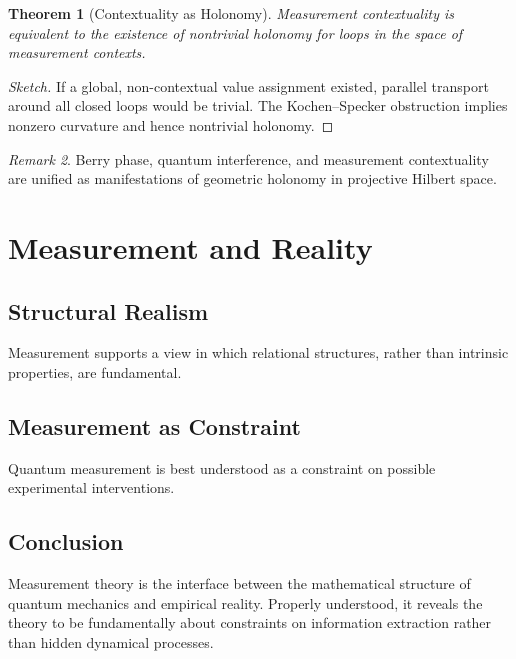 \documentclass[12pt]{book}
\theoremstyle{plain}
\newtheorem{theorem}{Theorem}[chapter]
\theoremstyle{definition}
\theoremstyle{remark}
\newtheorem{remark}[theorem]{Remark}
\begin{document}
\begin{theorem}[Contextuality as Holonomy]
Measurement contextuality is equivalent to the existence of nontrivial
holonomy for loops in the space of measurement contexts.
\end{theorem}

\begin{proof}[Sketch]
If a global, non-contextual value assignment existed, parallel transport
around all closed loops would be trivial.
The Kochen--Specker obstruction implies nonzero curvature and hence
nontrivial holonomy.
\end{proof}

\begin{remark}
Berry phase, quantum interference, and measurement contextuality are
unified as manifestations of geometric holonomy in projective Hilbert
space.
\end{remark}
\part{Measurement and Reality}

\chapter{Structural Realism}
Measurement supports a view in which relational structures, rather than intrinsic properties, are fundamental.

\chapter{Measurement as Constraint}
Quantum measurement is best understood as a constraint on possible experimental interventions.

\backmatter

\chapter*{Conclusion}
Measurement theory is the interface between the mathematical structure of quantum mechanics and empirical reality. Properly understood, it reveals the theory to be fundamentally about constraints on information extraction rather than hidden dynamical processes.
\end{document}
